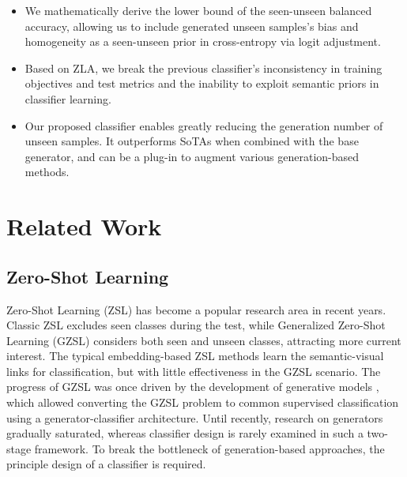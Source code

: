 \documentclass{article}
\begin{document}
	\begin{itemize}
\item We mathematically derive the lower bound of the seen-unseen balanced accuracy, allowing us to include generated unseen samples's bias and homogeneity as a seen-unseen prior in cross-entropy via logit adjustment.
\item Based on ZLA, we break the previous classifier's inconsistency in training objectives and test metrics and the inability to exploit semantic priors in classifier learning.
\item Our proposed classifier enables greatly reducing the generation number of unseen samples. It outperforms SoTAs when combined with the base generator, and can be a plug-in to augment various generation-based methods.
\end{itemize}
	
	\section{Related Work}
	\subsection{Zero-Shot Learning}
Zero-Shot Learning (ZSL) \cite{lampert2009learning,farhadi2009describing} has become a popular research area in recent years. Classic ZSL excludes
seen classes during the test, while Generalized Zero-Shot Learning (GZSL) \cite{chao2016empirical,xian2017zero} considers both seen and unseen classes, attracting more current interest. The typical embedding-based ZSL methods \cite{li2019rethinking,skorokhodov2020class} learn the semantic-visual links for classification, but with little effectiveness in the GZSL scenario. The progress of GZSL was once driven by the development of generative models \cite{kingma2013auto,goodfellow2014generative}, which allowed converting the GZSL problem to common supervised classification using a generator-classifier architecture. Until recently, research on generators \cite{shen2020invertible,han2021contrastive} gradually saturated, whereas classifier design is rarely examined in such a two-stage framework. To break the bottleneck of generation-based approaches, the principle design of a classifier is required.
\end{document}
